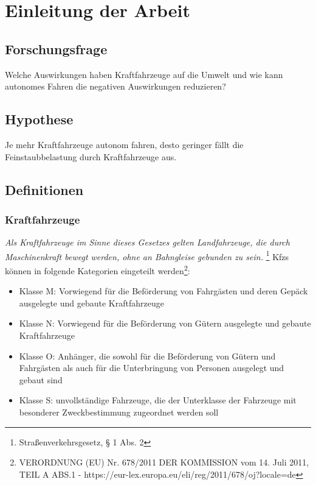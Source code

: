 \chapter{Einleitung der Arbeit}

\section{Forschungsfrage}

Welche Auswirkungen haben Kraftfahrzeuge auf die Umwelt und wie kann autonomes Fahren die negativen Auswirkungen reduzieren?

\section{Hypothese}

Je mehr Kraftfahrzeuge autonom fahren, desto geringer fällt die Feinstaubbelastung durch Kraftfahrzeuge aus.

\section{Definitionen}
\subsection{Kraftfahrzeuge}

\textit{Als Kraftfahrzeuge im Sinne dieses Gesetzes gelten Landfahrzeuge, die durch Maschinenkraft bewegt werden, ohne an Bahngleise gebunden zu sein.}
\footnote{Straßenverkehrsgesetz, § 1 Abs. 2}
\vspace{0.5cm}
\newline
\aclp{Kfz} können in folgende Kategorien eingeteilt werden\footnote{VERORDNUNG (EU) Nr. 678/2011 DER KOMMISSION
	vom 14. Juli 2011, TEIL A ABS.1 - https://eur-lex.europa.eu/eli/reg/2011/678/oj?locale=de}:
\begin{itemize}
	\item Klasse M: Vorwiegend für die Beförderung von Fahrgästen und deren Gepäck ausgelegte und gebaute Kraftfahrzeuge
	\item Klasse N: Vorwiegend für die Beförderung von Gütern ausgelegte und gebaute Kraftfahrzeuge
	\item Klasse O: Anhänger, die sowohl für die Beförderung von Gütern und Fahrgästen als auch für die Unterbringung von Personen ausgelegt und gebaut sind
	\item Klasse S: unvollständige Fahrzeuge, die der Unterklasse der Fahrzeuge mit besonderer Zweckbestimmung zugeordnet werden soll
\end{itemize}

